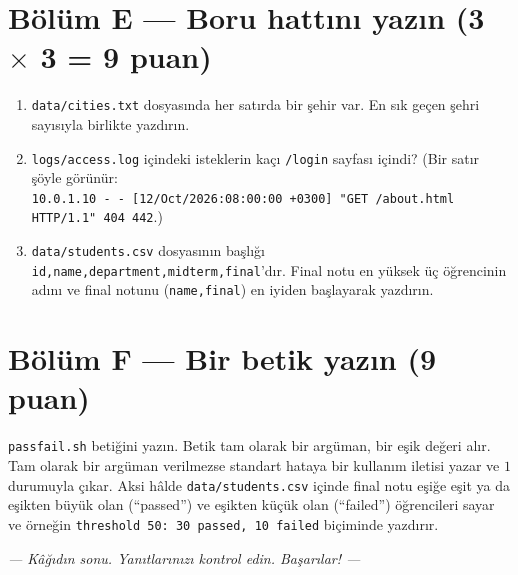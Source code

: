 \documentclass[11pt,a4paper]{article}
\begin{document}
\section*{Bölüm E --- Boru hattını yazın \hfill (3 $\times$ 3 = 9 puan)}
\begin{enumerate}[leftmargin=1.8em,label=E\arabic*.]
  \item \texttt{data/cities.txt} dosyasında her satırda bir şehir var. En sık geçen şehri sayısıyla birlikte yazdırın. \ans{1.1cm}
  \item \texttt{logs/access.log} içindeki isteklerin kaçı \texttt{/login} sayfası içindi? (Bir satır şöyle görünür:\\ \texttt{10.0.1.10 - - [12/Oct/2026:08:00:00 +0300] "GET /about.html HTTP/1.1" 404 442}.) \ans{1.1cm}
  \item \texttt{data/students.csv} dosyasının başlığı \texttt{id,name,department,midterm,final}'dır. Final notu en yüksek üç öğrencinin adını ve final notunu (\texttt{name,final}) en iyiden başlayarak yazdırın. \ans{1.1cm}
\end{enumerate}

\section*{Bölüm F --- Bir betik yazın \hfill (9 puan)}
\texttt{passfail.sh} betiğini yazın. Betik tam olarak bir argüman, bir eşik değeri alır. Tam olarak bir argüman verilmezse standart hataya bir kullanım iletisi yazar ve $1$ durumuyla çıkar. Aksi hâlde \texttt{data/students.csv} içinde final notu eşiğe eşit ya da eşikten büyük olan (``passed'') ve eşikten küçük olan (``failed'') öğrencileri sayar ve örneğin \texttt{threshold 50: 30 passed, 10 failed} biçiminde yazdırır.
\ans{9.0cm}

\begin{center}\itshape --- Kâğıdın sonu. Yanıtlarınızı kontrol edin. Başarılar! ---\end{center}
\end{document}

